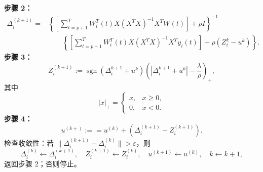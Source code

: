 \noindent\textbf{步骤 2：}
\[
\begin{aligned}
\Delta_i^{(k+1)}=&\left\{\left[\sum_{t=p+1}^TW_i^T(t)X(X^TX)^{-1}X^TW(t)\right]+\rho I\right\}^{-1}\\
&\qquad\left\{\left[\sum_{t=p+1}^TW_i^T(t)X(X^TX)^{-1}X^Ty_i(t)\right]+\rho(Z_i^k-u^k)\right\}.
\end{aligned}
\]
\noindent\textbf{步骤 3：}
\[
Z_i^{(k+1)}:=\operatorname{sgn}(\Delta_i^{k+1}+u^k)\left(|\Delta_i^{k+1}+u^k|-\frac\lambda\rho\right)_+,
\]
其中
\[
|x|_+=\begin{cases}x,&x\geq0,\\0,&x<0.\end{cases}
\]
\noindent\textbf{步骤 4：}
\[
u^{(k+)}:==u^{(k)}+(\Delta_i^{(k+1)}-Z_i^{(k+1)}).
\]
检查收敛性：若 $\lVert\Delta_i^{(k+1)}-\Delta_i^{(k)}\rVert>\varepsilon$，则
\[
\Delta_i^{(k)}\leftarrow\Delta_i^{(k+1)},\quad
Z_i^{(k+1)}\leftarrow Z_i^{(k)},\quad
u^{(k+1)}\leftarrow u^{(k)},\quad k\leftarrow k+1,
\]
返回步骤 2；否则停止。

